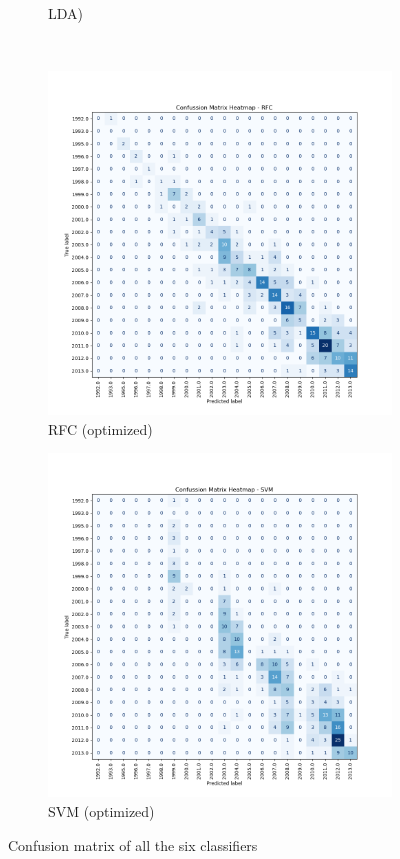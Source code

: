 \documentclass[conference,onecolumn]{IEEEtran}
\begin{document}
\begin{figure}[htbp]
\begin{subfigure}{0.4\textwidth}
		\caption{LDA)}
		\label{appx:cmheatmaplda}
    \end{subfigure}\\
    \begin{subfigure}{0.4\textwidth}
        \centering
		\includegraphics[width=\linewidth]{Plots/CM_Heatmap_RFC.png}
		\caption{RFC (optimized)}
		\label{appx:cmheatmaprfc}
    \end{subfigure}%
    \begin{subfigure}{0.4\textwidth}
        \centering
		\includegraphics[width=\linewidth]{Plots/CM_Heatmap_SVM.png}
		\caption{SVM (optimized)}
		\label{appx:cmheatmapsvm}
    \end{subfigure}
    \caption{Confusion matrix of all the six classifiers}
    \label{appdx:confusionMatrixOfAllTheSixClassifiers}
\end{figure}
\end{document}
